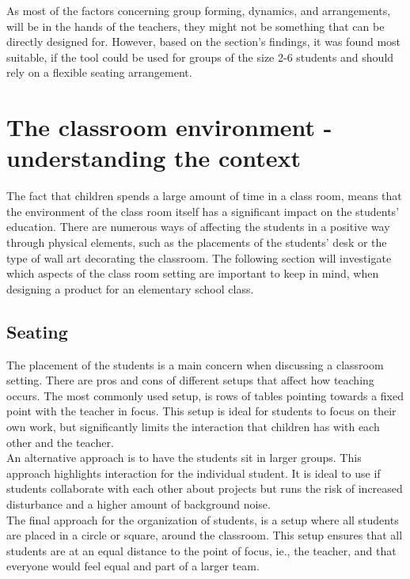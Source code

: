 As most of the factors concerning group forming, dynamics, and arrangements,  will be in the hands of the teachers, they might not be something that can be directly designed for.  
However, based on the section's findings, it was found most suitable, if the tool could be used for groups of the size 2-6 students and should rely on a flexible seating arrangement.
 

\section{The classroom environment -understanding the context} %


The fact that children spends a large amount of time in a class room, means that the environment of the class room itself has a significant impact on the students’ education. There are numerous ways of affecting the students in a positive way through physical elements, such as the placements of the students’ desk or the type of wall art decorating the classroom. The following section will investigate which aspects of the class room setting are important to keep in mind, when designing a product for an elementary school class.\\

\subsection{Seating}
The placement of the students is a main concern when discussing a classroom setting. There are pros and cons of different setups that affect how teaching occurs.
The most commonly used setup, is rows of tables pointing towards a fixed point with the teacher in focus. This setup is ideal for students to focus on their own work, but significantly limits the interaction that children has with each other and the teacher. \\

An alternative approach is to have the students sit in larger groups. This approach highlights interaction for the individual student. It is ideal to use if students collaborate with each other about projects but runs the risk of increased disturbance and a higher amount of background noise.\\

The final approach for the organization of students, is a setup where all students are placed in a circle or square, around the classroom. This setup ensures that all students are at an equal distance to the point of focus, ie., the teacher, and that everyone would feel equal and part of a larger team.\\

